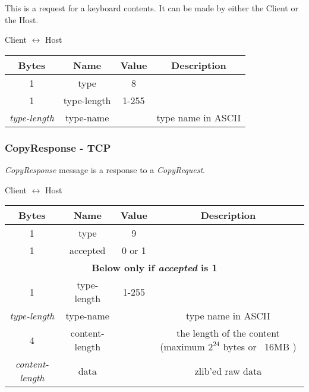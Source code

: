 \documentclass{article}
\begin{document}
    This is a request for a keyboard contents. It can be made by either the Client or the Host.

    \begin{center}
        Client $\leftrightarrow$ Host\\
        \begin{tabular}{|c|c|c|c|}
            \hline
            \textbf{Bytes}     & \textbf{Name} & \textbf{Value} & \textbf{Description} \\
            \hline
            1                  & type          & 8              &                      \\
            \hline
            1                  & type-length   & 1-255          &                      \\
            \hline
            \emph{type-length} & type-name     &                & type name in ASCII   \\
            \hline
        \end{tabular}
    \end{center}

    \subsubsection{CopyResponse - TCP}

    \emph{CopyResponse} message is a response to a \emph{CopyRequest}.

    \begin{center}
        Client $\leftrightarrow$ Host\\
        \begin{tabular}{|c|c|c|c|}
            \hline
            \textbf{Bytes}        & \textbf{Name} & \textbf{Value} & \textbf{Description} \\
            \hline
            1                     & type          & 9              &                      \\
            \hline
            1                     & accepted      & 0 or 1         &                      \\
            \hline
            \multicolumn{4}{|c|}{\textbf{Below only if \emph{accepted} is 1} } \\
            \hline
            1                     & type-length   & 1-255          &                      \\
            \hline
            \emph{type-length}    & type-name     &                & type name in ASCII   \\
            \hline
            4 & content-length & & the length of the content  (maximum $2^{24}$
            bytes or ~16MB ) \\
            \hline
            \emph{content-length} & data          &                & zlib'ed raw data     \\
            \hline
        \end{tabular}
    \end{center}
\end{document}
